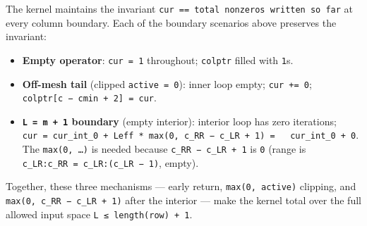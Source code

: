 \documentclass[
]{article}
\providecommand{\tightlist}{%
  \setlength{\itemsep}{0pt}\setlength{\parskip}{0pt}}
\begin{document}
The kernel maintains the invariant
\texttt{cur\ ==\ total\ nonzeros\ written\ so\ far} at every column
boundary. Each of the boundary scenarios above preserves the invariant:

\begin{itemize}
\tightlist
\item
  \textbf{Empty operator}: \texttt{cur\ =\ 1} throughout;
  \texttt{colptr} filled with \texttt{1}s.
\item
  \textbf{Off-mesh tail} (clipped \texttt{active\ =\ 0}): inner loop
  empty; \texttt{cur\ +=\ 0};
  \texttt{colptr{[}c\ −\ cmin\ +\ 2{]}\ =\ cur}.
\item
  \textbf{\texttt{L\ =\ m\ +\ 1} boundary} (empty interior): interior
  loop has zero iterations;
  \texttt{cur\ =\ cur\_int\_0\ +\ Leff\ *\ max(0,\ c\_RR\ −\ c\_LR\ +\ 1)\ =\ \ \ cur\_int\_0\ +\ 0}.
  The \texttt{max(0,\ …)} is needed because
  \texttt{c\_RR\ −\ c\_LR\ +\ 1} is \texttt{0} (range is
  \texttt{c\_LR:c\_RR\ =\ c\_LR:(c\_LR\ −\ 1)}, empty).
\end{itemize}

Together, these three mechanisms --- early return,
\texttt{max(0,\ active)} clipping, and
\texttt{max(0,\ c\_RR\ −\ c\_LR\ +\ 1)} after the interior --- make the
kernel total over the full allowed input space
\texttt{L\ ≤\ length(row)\ +\ 1}.
\end{document}
